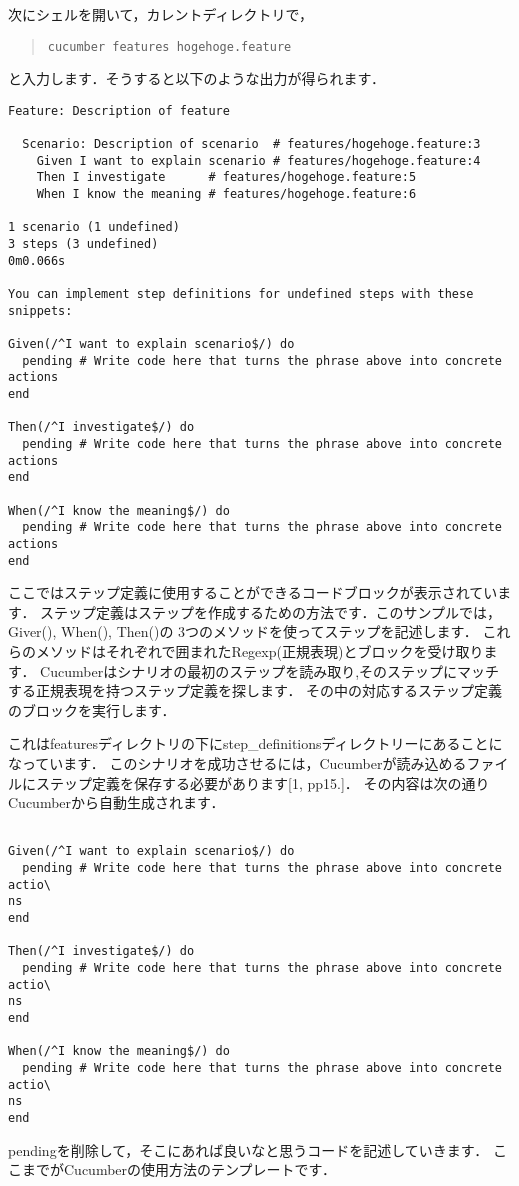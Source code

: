 次にシェルを開いて，カレントディレクトリで，
\begin{quote}\begin{verbatim}
cucumber features hogehoge.feature
\end{verbatim}\end{quote}
と入力します．そうすると以下のような出力が得られます．
\begin{lstlisting}[style=customRuby,basicstyle={\scriptsize\ttfamily}]
Feature: Description of feature

  Scenario: Description of scenario  # features/hogehoge.feature:3
    Given I want to explain scenario # features/hogehoge.feature:4
    Then I investigate      # features/hogehoge.feature:5
    When I know the meaning # features/hogehoge.feature:6

1 scenario (1 undefined)
3 steps (3 undefined)
0m0.066s

You can implement step definitions for undefined steps with these snippets:

Given(/^I want to explain scenario$/) do
  pending # Write code here that turns the phrase above into concrete actions
end

Then(/^I investigate$/) do
  pending # Write code here that turns the phrase above into concrete actions
end

When(/^I know the meaning$/) do
  pending # Write code here that turns the phrase above into concrete actions
end

\end{lstlisting}
ここではステップ定義に使用することができるコードブロックが表示されています．
ステップ定義はステップを作成するための方法です．このサンプルでは，Giver(), When(), Then()の
3つのメソッドを使ってステップを記述します．
これらのメソッドはそれぞれ\/\/で囲まれたRegexp(正規表現)とブロックを受け取ります．
Cucumberはシナリオの最初のステップを読み取り,そのステップにマッチする正規表現を持つステップ定義を探します．
その中の対応するステップ定義のブロックを実行します．

これはfeaturesディレクトリの下にstep\_definitionsディレクトリーにあることになっています．
このシナリオを成功させるには，Cucumberが読み込めるファイルにステップ定義を保存する必要があります[1, pp15.]．
その内容は次の通りCucumberから自動生成されます．
\begin{lstlisting}[style=customRuby,basicstyle={\scriptsize\ttfamily}]

Given(/^I want to explain scenario$/) do
  pending # Write code here that turns the phrase above into concrete actio\
ns  
end

Then(/^I investigate$/) do
  pending # Write code here that turns the phrase above into concrete actio\
ns  
end

When(/^I know the meaning$/) do
  pending # Write code here that turns the phrase above into concrete actio\
ns  
end

\end{lstlisting}
pendingを削除して，そこにあれば良いなと思うコードを記述していきます．
ここまでがCucumberの使用方法のテンプレートです．

